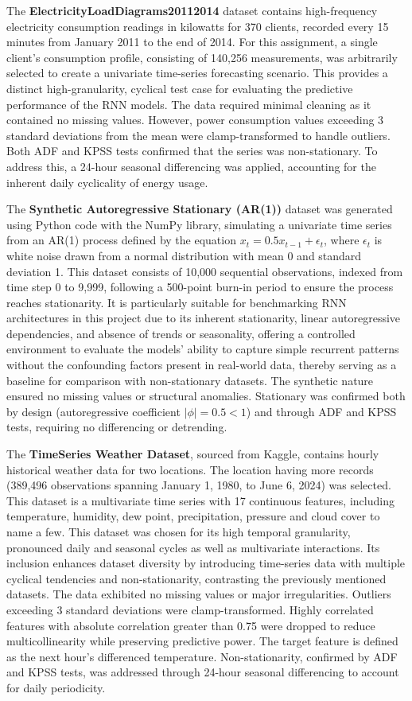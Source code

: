 \documentclass[conference, 10pt]{IEEEtran}
\begin{document}
The \textbf{ElectricityLoadDiagrams20112014} dataset contains high-frequency electricity consumption readings in
kilowatts for 370 clients, recorded every 15 minutes from January 2011 to the end of 2014. For this assignment, a single
client's consumption profile, consisting of 140,256 measurements, was arbitrarily selected to create a univariate
time-series forecasting scenario. This provides a distinct high-granularity, cyclical test case for evaluating the
predictive performance of the RNN models. The data required minimal cleaning as it contained no missing values. However,
power consumption values exceeding 3 standard deviations from the mean were clamp-transformed to handle outliers. Both
ADF and KPSS tests confirmed that the series was non-stationary. To address this, a 24-hour seasonal differencing was
applied, accounting for the inherent daily cyclicality of energy usage.

The \textbf{Synthetic Autoregressive Stationary (AR(1))} dataset was generated using Python code with the NumPy library,
simulating a univariate time series from an AR(1) process defined by the equation $x_t = 0.5 x_{t-1} + \epsilon_t$,
where $\epsilon_t$ is white noise drawn from a normal distribution with mean 0 and standard deviation 1. This dataset
consists of 10,000 sequential observations, indexed from time step 0 to 9,999, following a 500-point burn-in period to
ensure the process reaches stationarity. It is particularly suitable for benchmarking RNN architectures in this project
due to its inherent stationarity, linear autoregressive dependencies, and absence of trends or seasonality, offering a
controlled environment to evaluate the models' ability to capture simple recurrent patterns without the confounding
factors present in real-world data, thereby serving as a baseline for comparison with non-stationary datasets. The
synthetic nature ensured no missing values or structural anomalies. Stationary was confirmed both by design
(autoregressive coefficient $|\phi| = 0.5 < 1$) and through ADF and KPSS tests, requiring no differencing or detrending.

The \textbf{TimeSeries Weather Dataset}, sourced from Kaggle, contains hourly historical weather data for two locations.
The location having more records (389,496 observations spanning January 1, 1980, to June 6, 2024) was selected. This
dataset is a multivariate time series with 17 continuous features, including temperature, humidity, dew point,
precipitation, pressure and cloud cover to name a few. This dataset was chosen for its high temporal granularity,
pronounced daily and seasonal cycles as well as multivariate interactions. Its inclusion enhances dataset diversity by
introducing time-series data with multiple cyclical tendencies and non-stationarity, contrasting the previously
mentioned datasets. The data exhibited no missing values or major irregularities. Outliers exceeding 3 standard
deviations were clamp-transformed. Highly correlated features with absolute correlation greater than 0.75 were dropped
to reduce multicollinearity while preserving predictive power. The target feature is defined as the next hour's
differenced temperature. Non-stationarity, confirmed by ADF and KPSS tests, was addressed through 24-hour seasonal
differencing to account for daily periodicity.
\end{document}
